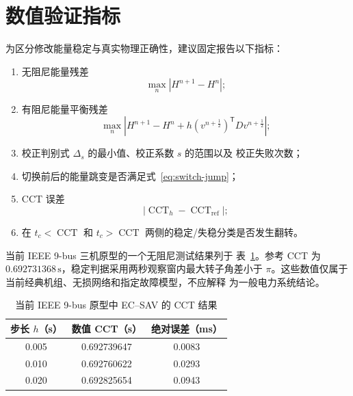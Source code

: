 \documentclass[UTF8,11pt,a4paper]{ctexart}
\theoremstyle{definition}
\theoremstyle{remark}
\newcommand{\trans}{\mathsf{T}}
\begin{document}
\section{数值验证指标}

为区分修改能量稳定与真实物理正确性，建议固定报告以下指标：
\begin{enumerate}[label=(\arabic*)]
  \item 无阻尼能量残差
  \begin{equation}
    \max_n\left|H^{n+1}-H^n\right|;
  \end{equation}

  \item 有阻尼能量平衡残差
  \begin{equation}
    \max_n\left|
    H^{n+1}-H^n
    +h(v^{n+\frac12})^{\trans}Dv^{n+\frac12}
    \right|;
  \end{equation}

  \item 校正判别式 \(\Delta_s\) 的最小值、校正系数 \(s\) 的范围以及
        校正失败次数；

  \item 切换前后的能量跳变是否满足式~\eqref{eq:switch-jump}；

  \item CCT 误差
  \begin{equation}
    \left|\operatorname{CCT}_h-\operatorname{CCT}_{\mathrm{ref}}\right|;
  \end{equation}

  \item 在 \(t_c<\operatorname{CCT}\) 和
        \(t_c>\operatorname{CCT}\) 两侧的稳定/失稳分类是否发生翻转。
\end{enumerate}

当前 IEEE 9-bus 三机原型的一个无阻尼测试结果列于
表~\ref{tab:cct-result}。参考 CCT 为
\(0.692731368\,\mathrm{s}\)，稳定判据采用两秒观察窗内最大转子角差小于
\(\pi\)。这些数值仅属于当前经典机组、无损网络和指定故障模型，不应解释
为一般电力系统结论。

\begin{table}[htbp]
  \centering
  \caption{当前 IEEE 9-bus 原型中 EC--SAV 的 CCT 结果}
  \label{tab:cct-result}
  \begin{tabular}{ccc}
    \toprule
    步长 \(h\)（s） & 数值 CCT（s） & 绝对误差（ms） \\
    \midrule
    0.005 & 0.692739647 & 0.0083 \\
    0.010 & 0.692760622 & 0.0293 \\
    0.020 & 0.692825654 & 0.0943 \\
    \bottomrule
  \end{tabular}
\end{table}
\end{document}
